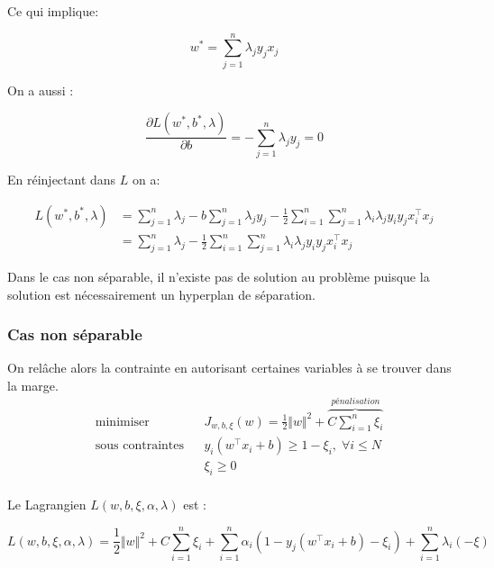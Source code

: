 Ce qui implique:

\begin{equation*}
    w^* = \sum_{j=1}^n \lambda_j y_j x_j
\end{equation*}

On a aussi :

\begin{equation*}
    \frac{ \partial L (w^*,b^*,\lambda)}{\partial b} =  - \sum_{j=1}^n \lambda_j y_j = 0
\end{equation*}

En réinjectant dans $L$ on a:

\begin{align*}
    L (w^*,b^*,\lambda) &= \sum_{j=1}^n \lambda_j - b \sum_{j=1}^n \lambda_j y_j - \frac{1}{2} \sum_{i=1}^n \sum_{j=1}^n \lambda_i \lambda_j y_i y_j x_i^\intercal x_j \\
    &= \sum_{j=1}^n \lambda_j - \frac{1}{2} \sum_{i=1}^n \sum_{j=1}^n \lambda_i \lambda_j y_i y_j x_i^\intercal x_j 
\end{align*}

Dans le cas non séparable, il n'existe pas de solution au problème puisque la solution est nécessairement un hyperplan de séparation.
\subsubsection{Cas non séparable}

On relâche alors la contrainte en autorisant certaines variables à se trouver dans la marge.
\begin{equation*}
    \begin{aligned}
        & \text{minimiser}
        & & J_{w,b,\xi} (w) = \frac{1}{2} \Vert w \Vert^2 + \overbrace{C \sum_{i=1}^n \xi_i}^{\textit{pénalisation}} \\
        & \text{sous contraintes}
        & & y_i \left( w^\intercal x_i + b \right)\geq 1 - \xi_i, \; \forall i \leq N  \\
        & & & \xi_i \geq 0 \\
    \end{aligned}
\end{equation*}

Le Lagrangien $L(w,b,\xi,\alpha,\lambda)$ est :

\begin{equation*}
    L(w,b,\xi,\alpha,\lambda) = \frac{1}{2} \Vert w \Vert^2 + C \sum_{i=1}^n \xi_i + \sum_{i=1}^n \alpha_i ( 1 - y_j ( w^\intercal x_i + b ) - \xi_i ) + \sum_{i=1}^n \lambda_i ( - \xi )
\end{equation*}


